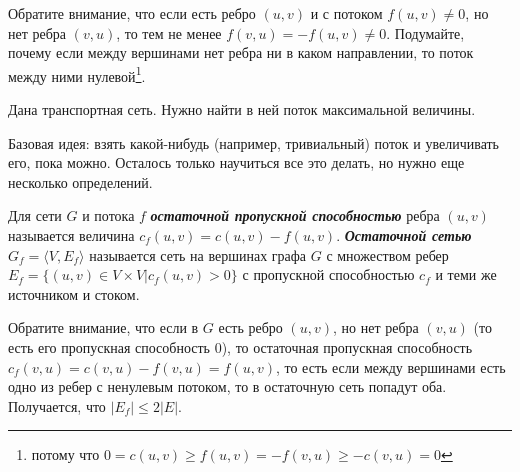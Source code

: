 Обратите внимание, что если есть ребро $(u,v)$ и с потоком $f(u,v)\ne0$, но нет ребра $(v,u)$, то тем не менее $f(v,u)=-f(u,v)\ne0$. Подумайте, почему если между вершинами нет ребра ни в каком направлении, то поток между ними нулевой\footnote{потому что $0=c(u,v)\ge f(u,v)=-f(v,u)\ge -c(v,u)=0$}.
\begin{problem}
	Дана транспортная сеть. Нужно найти в ней поток максимальной величины.
\end{problem}
Базовая идея: взять какой-нибудь (например, тривиальный) поток и увеличивать его, пока можно. Осталось только научиться все это делать, но нужно еще несколько определений.
\begin{definition}
	Для сети $G$ и потока $f$ {\bf\it остаточной пропускной способностью} ребра $(u,v)$ называется величина $c_f(u,v)=c(u,v)-f(u,v)$. {\bf\it Остаточной сетью} $G_f=\langle V,E_f\rangle$ называется сеть на вершинах графа $G$ с множеством ребер $E_f=\{(u,v)\in V\times V|c_f(u,v)>0\}$ с пропускной способностью $c_f$ и теми же источником и стоком.
\end{definition}

Обратите внимание, что если в $G$ есть ребро $(u,v)$, но нет ребра $(v,u)$ (то есть его пропускная способность 0), то остаточная пропускная способность $c_f(v,u)=c(v,u)-f(v,u)=f(u,v)$, то есть если между вершинами есть одно из ребер с ненулевым потоком, то в остаточную сеть попадут оба.
Получается, что $|E_f|\le 2|E|$\label{someshit6}.

